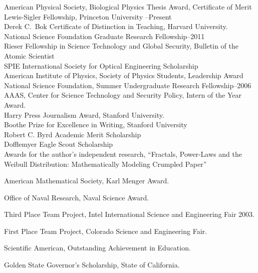 \documentclass[11pt]{article}
\newenvironment{listinline}{
	  \begin{list}{}{
	      \setlength{\itemsep}{0in}
	      \setlength{\parsep}{0in} \setlength{\parskip}{0in}
	      \setlength{\topsep}{0in} \setlength{\partopsep}{0in} 
	      \setlength{\leftmargin}{0.2in}\setlength{\rightmargin}{0.2in}}}{\end{list}}
\begin{document}
American Physical Society, Biological Physics Thesis Award, Certificate of Merit \\
Lewis-Sigler Fellowship, Princeton University --Present\\
Derek C.~Bok Certificate of Distinction in Teaching, Harvard University.\\
National Science Foundation Graduate Research Fellowship--2011\\
Rieser Fellowship in Science Technology and Global Security, Bulletin of the Atomic Scientist\\
SPIE International Society for Optical Engineering Scholarship\\
American Institute of Physics, Society of Physics Students, Leadership Award\\
National Science Foundation, Summer Undergraduate Research Fellowship--2006\\
AAAS, Center for Science Technology and Security Policy, Intern of the Year Award.\\
Harry Press Journalism Award, Stanford University.\\
Boothe Prize for Excellence in Writing, Stanford University\\
Robert C. Byrd Academic Merit Scholarship\\
Dofflemyer Eagle Scout Scholarship\\
Awards for the author's independent research, ``Fractals, Power-Laws and the Weibull Distribution: Mathematically Modeling Crumpled Paper''\\
\vspace{-\baselineskip}
\begin{listinline}
\item American Mathematical Society, Karl Menger Award.
\item Office of Naval Research, Naval Science Award.
\item Third Place Team Project, Intel International Science and Engineering Fair 2003.
\item First Place Team Project, Colorado Science and Engineering Fair.
\item Scientific American, Outstanding Achievement in Education.
\end{listinline}
Golden State Governor's Scholarship, State of California.\\
\end{document}
